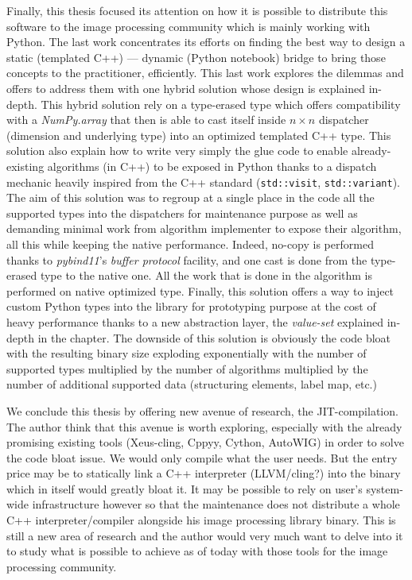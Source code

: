 Finally, this thesis focused its attention on how it is possible to distribute this software to the image processing
community which is mainly working with Python. The last work concentrates its efforts on finding the best way to design
a static (templated C++) --- dynamic (Python notebook) bridge to bring those concepts to the practitioner, efficiently.
This last work explores the dilemmas and offers to address them with one hybrid solution whose design is explained
in-depth. This hybrid solution rely on a type-erased type which offers compatibility with a \emph{NumPy.array} that then
is able to cast itself inside \(n \times n\) dispatcher (dimension and underlying type) into an optimized templated C++
type. This solution also explain how to write very simply the glue code to enable already-existing algorithms (in C++)
to be exposed in Python thanks to a dispatch mechanic heavily inspired from the C++ standard (\texttt{std::visit},
\texttt{std::variant}). The aim of this solution was to regroup at a single place in the code all the supported types
into the dispatchers for maintenance purpose as well as demanding minimal work from algorithm implementer to expose
their algorithm, all this while keeping the native performance. Indeed, no-copy is performed thanks to \emph{pybind11}'s
\emph{buffer protocol} facility, and one cast is done from the type-erased type to the native one. All the work that is
done in the algorithm is performed on native optimized type. Finally, this solution offers a way to inject custom Python
types into the library for prototyping purpose at the cost of heavy performance thanks to a new abstraction layer, the
\emph{value-set} explained in-depth in the chapter. The downside of this solution is obviously the code bloat with the
resulting binary size exploding exponentially with the number of supported types multiplied by the number of algorithms
multiplied by the number of additional supported data (structuring elements, label map, etc.)

We conclude this thesis by offering new avenue of research, the JIT-compilation. The author think that this avenue is
worth exploring, especially with the already promising existing tools (Xeus-cling, Cppyy, Cython, AutoWIG) in order to
solve the code bloat issue. We would only compile what the user needs. But the entry price may be to statically link a
C++ interpreter (LLVM/cling?) into the binary which in itself would greatly bloat it. It may be possible to rely on
user's system-wide infrastructure however so that the maintenance does not distribute a whole C++ interpreter/compiler
alongside his image processing library binary. This is still a new area of research and the author would very much want
to delve into it to study what is possible to achieve as of today with those tools for the image processing community.



